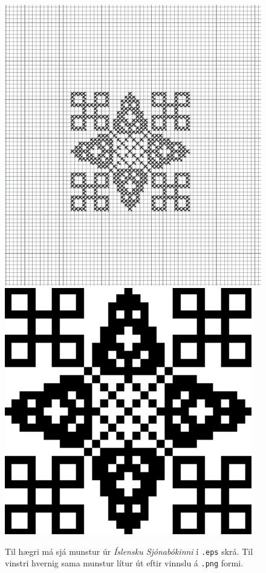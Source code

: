 \begin{figure}
    \centering
    \includegraphics[height=.3\textheight]{myndir/snaeja/sjonabok_before.png}
    \includegraphics[height=.3\textheight]{myndir/snaeja/sjonabok_after.png}
    \caption{Til hægri má sjá munstur úr \textit{Íslensku Sjónabókinni} í \texttt{.eps} skrá. Til vinstri hvernig sama munstur lítur út eftir vinnslu á \texttt{.png} formi.}
    \label{fig: sjonabok_munstur}
\end{figure}

